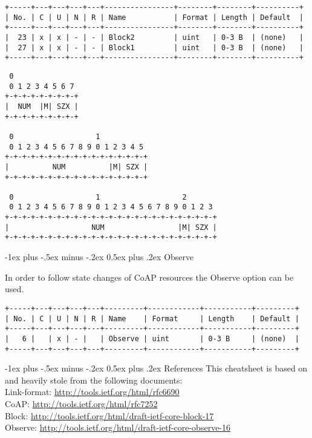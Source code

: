\documentclass[a4,10pt,landscape]{article}
\makeatletter
\renewcommand{\section}{\@startsection{section}{1}{0mm}%
                                {-1ex plus -.5ex minus -.2ex}%
                                {0.5ex plus .2ex}%
                                {\normalfont\large\bfseries}}
\makeatother
\begin{document}
\begin{multicols}{3}
{\tiny
\begin{verbatim}
+-----+---+---+---+---+----------------+--------+--------+----------+
| No. | C | U | N | R | Name           | Format | Length | Default  |
+-----+---+---+---+---+----------------+--------+--------+----------+
|  23 | x | x | - | - | Block2         | uint   | 0-3 B  | (none)   |
|  27 | x | x | - | - | Block1         | uint   | 0-3 B  | (none)   |
+-----+---+---+---+---+----------------+--------+--------+----------+
\end{verbatim}
}
{\tiny
\begin{verbatim}
 0
 0 1 2 3 4 5 6 7
+-+-+-+-+-+-+-+-+
|  NUM  |M| SZX |
+-+-+-+-+-+-+-+-+

 0                   1
 0 1 2 3 4 5 6 7 8 9 0 1 2 3 4 5
+-+-+-+-+-+-+-+-+-+-+-+-+-+-+-+-+
|          NUM          |M| SZX |
+-+-+-+-+-+-+-+-+-+-+-+-+-+-+-+-+

 0                   1                   2
 0 1 2 3 4 5 6 7 8 9 0 1 2 3 4 5 6 7 8 9 0 1 2 3
+-+-+-+-+-+-+-+-+-+-+-+-+-+-+-+-+-+-+-+-+-+-+-+-+
|                   NUM                 |M| SZX |
+-+-+-+-+-+-+-+-+-+-+-+-+-+-+-+-+-+-+-+-+-+-+-+-+
\end{verbatim}
}

\section{Observe}

In order to follow state changes of CoAP resources the Observe option
can be used.

{\tiny
\begin{verbatim}
+-----+---+---+---+---+---------+------------+-----------+---------+
| No. | C | U | N | R | Name    | Format     | Length    | Default |
+-----+---+---+---+---+---------+------------+-----------+---------+
|   6 |   | x | - |   | Observe | uint       | 0-3 B     | (none)  |
+-----+---+---+---+---+---------+------------+-----------+---------+
\end{verbatim}
}

\section{References}
This cheatsheet is based on and heavily stole from the following
documents:\\

{\tiny
Link-format: \url{http://tools.ietf.org/html/rfc6690}\\
CoAP: \url{http://tools.ietf.org/html/rfc7252}\\
Block: \url{http://tools.ietf.org/html/draft-ietf-core-block-17}\\
Observe: \url{http://tools.ietf.org/html/draft-ietf-core-observe-16}\\
}
%
%
\end{multicols}
\end{document}
